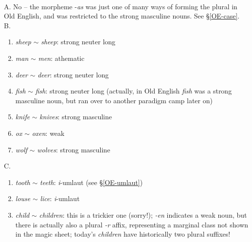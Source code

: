\noindent\textbf{}\\
\noindent A. No -- the morpheme -\emph{as} was just one of many ways of forming the plural in Old English, and was restricted to the strong masculine nouns. See §\ref{OE-case}.\\

\noindent B.

\begin{enumerate}
  \item \textit{sheep} $\sim$ \textit{sheep}: strong neuter long
  \item \textit{man} $\sim$ \textit{men}: athematic
  \item \textit{deer} $\sim$ \textit{deer}: strong neuter long
  \item \textit{fish} $\sim$ \textit{fish}: strong neuter long (actually, in Old English \textit{fish} was a strong masculine noun, but ran over to another paradigm camp later on)
  \item \textit{knife} $\sim$ \textit{knives}: strong masculine
  \item \textit{ox} $\sim$ \textit{oxen}: weak
  \item \textit{wolf} $\sim$ \textit{wolves}: strong masculine
\end{enumerate}

\noindent C.

\begin{enumerate}
  \item \textit{tooth} $\sim$ \textit{teeth}: \emph{i}-umlaut (see §\ref{OE-umlaut})
  \item \textit{louse} $\sim$ \textit{lice}: \emph{i}-umlaut
  \item \textit{child} $\sim$ \textit{children}: this is a trickier one (sorry!); \textit{-en} indicates a weak noun, but there is actually also a plural \textit{-r} affix, representing a marginal class not shown in the magic sheet; today's \textit{children} have historically two plural suffixes!
\end{enumerate}


\noindent\textbf{}

